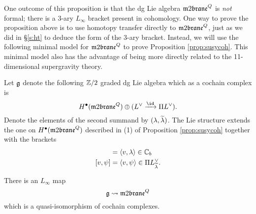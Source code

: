 \parsec[]

One outcome of this proposition is that the dg Lie algebra $\m2^Q$ is {\em not} formal; there is a 3-ary $L_\infty$ bracket present in cohomology. 
One way to prove the proposition above is to use homotopy transfer directly to $\m2^Q$, just as we did in \S \ref{s:ht} to deduce the form of the $3$-ary bracket. 
Instead, we will use the following minimal model for $\m2^Q$ to prove Proposition \ref{prop:susycoh}.
This minimal model also has the advantage of being more directly related to the 11-dimensional supergravity theory.

\begin{lem}
\label{lem:gmodel}
Let $\mathfrak g$ denote the following $\mathbb Z/2$ graded dg Lie algebra which as a cochain complex is
\[
H^\bu(\m2^Q) \oplus (L^\vee \xto{\id} \Pi L^\vee)  .
\]
Denote the elements of the second summand by $(\lambda, \widetilde\lambda)$. 
The Lie structure extends the one on $H^\bu(\m2^Q)$ described in (1) of Proposition \ref{prop:susycoh} together with the brackets
\begin{align*}
[v,\lambda] & = \<v, \lambda\> \in \CC_b \\ 
[v,\psi] & = \<v, \psi\> \in \Pi L^\vee_{\Tilde{\lambda}}.
\end{align*}

There is an $L_\infty$ map 
\[
\fg \rightsquigarrow \m2^Q
\] 
which is a quasi-isomorphism of cochain complexes.  
\end{lem}
